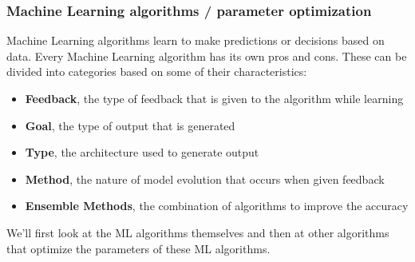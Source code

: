 \subsubsection{Machine Learning algorithms / parameter optimization}
Machine Learning algorithms learn to make predictions or decisions based on data. Every Machine Learning algorithm has its own pros and cons. These can be divided into categories based on some of their characteristics:
\begin{itemize}
	\item \textbf{Feedback}, the type of feedback that is given to the algorithm while learning
	\item \textbf{Goal}, the type of output that is generated
	\item \textbf{Type}, the architecture used to generate output
	\item \textbf{Method}, the nature of model evolution that occurs when given feedback
	\item \textbf{Ensemble Methods}, the combination of algorithms to improve the accuracy
\end{itemize}
We'll first look at the ML algorithms themselves and then at other algorithms that optimize the parameters of these ML algorithms.

